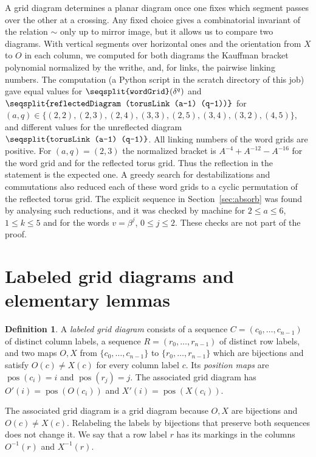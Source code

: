 \documentclass[11pt]{amsart}
\theoremstyle{definition}
\newtheorem{definition}[theorem]{Definition}
\theoremstyle{remark}
\newcommand{\lean}[1]{\texttt{\seqsplit{#1}}}
\newcommand{\Mov}{\mathrel{\sim}}
\DeclareMathOperator{\pos}{pos}
\begin{document}
A grid diagram determines a planar diagram once one fixes which segment passes over the other at
a crossing. Any fixed choice gives a combinatorial invariant of the relation $\Mov$ only up to
mirror image, but it allows us to compare two diagrams. With vertical segments over horizontal
ones and the orientation from $X$ to $O$ in each column, we computed for both diagrams the
Kauffman bracket polynomial normalized by the writhe, and, for links, the pairwise linking
numbers. The computation (a Python script in the scratch directory of this job) gave equal values
for $\lean{wordGrid}(\delta^q)$ and $\lean{reflectedDiagram (torusLink (a-1) (q-1))}$ for
$(a,q)\in\{(2,2),(2,3),(2,4),(3,3),(2,5),(3,4),(3,2),(4,5)\}$, and different values for the
unreflected diagram $\lean{torusLink (a-1) (q-1)}$. All linking numbers of the word grids are
positive. For $(a,q)=(2,3)$ the normalized bracket is $A^{-4}+A^{-12}-A^{-16}$ for the word grid
and for the reflected torus grid. Thus the reflection in the statement is the expected one. A
greedy search for destabilizations and commutations also reduced each of these word grids to a
cyclic permutation of the reflected torus grid. The explicit sequence in
Section~\ref{sec:absorb} was found by analysing such reductions, and it was checked by machine for
$2\le a\le6$, $1\le k\le 5$ and for the words $v=\beta^j$, $0\le j\le2$. These checks are not part
of the proof.

\section{Labeled grid diagrams and elementary lemmas}\label{sec:labeled}

\begin{definition}\label{def:labeled}
A \emph{labeled grid diagram} consists of a sequence $C=(c_0,\dots,c_{n-1})$ of distinct column
labels, a sequence $R=(r_0,\dots,r_{n-1})$ of distinct row labels, and two maps $O,X$ from
$\{c_0,\dots,c_{n-1}\}$ to $\{r_0,\dots,r_{n-1}\}$ which are bijections and satisfy $O(c)\ne X(c)$ for
every column label $c$. Its \emph{position maps} are $\pos(c_i)=i$ and $\pos(r_j)=j$. The associated
grid diagram has $O'(i)=\pos(O(c_i))$ and $X'(i)=\pos(X(c_i))$.
\end{definition}

The associated grid diagram is a grid diagram because $O,X$ are bijections and $O(c)\ne X(c)$.
Relabeling the labels by bijections that preserve both sequences does not change it. We say that
a row label $r$ has its markings in the columns $O^{-1}(r)$ and $X^{-1}(r)$.
\end{document}
